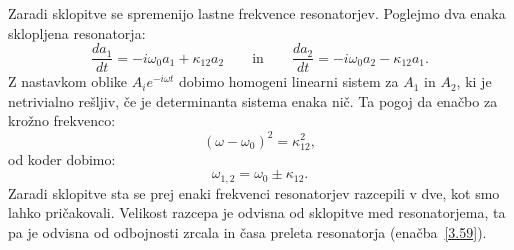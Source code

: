 Zaradi sklopitve se spremenijo lastne frekvence resonatorjev. 
Poglejmo dva enaka sklopljena resonatorja:
\begin{equation}
\frac{da_1}{dt}  =  -i\omega_{0}a_{1}+\kappa_{12}a_{2} \qquad \mathrm{in} \qquad 
\frac{da_2}{dt} =  -i\omega_{0}a_{2}-\kappa_{12}a_{1}.
\end{equation}
Z nastavkom oblike $A_{i}e^{-i\omega t}$ dobimo homogeni linearni sistem za $A_{1}$ in
$A_{2}$, ki je netrivialno rešljiv, če je determinanta sistema enaka nič.
Ta pogoj da enačbo za krožno frekvenco:
\begin{equation}
(\omega-\omega_{0})^{2}=\kappa_{12}^{2}\label{3.61},
\end{equation}
od koder dobimo:
\begin{equation}
\omega_{1,2}=\omega_{0}\pm\kappa_{12}.\label{3.62}
\end{equation}
Zaradi sklopitve sta se prej enaki frekvenci resonatorjev razcepili v dve, kot
smo lahko pričakovali. Velikost razcepa je odvisna od sklopitve med resonatorjema, ta
pa je odvisna od odbojnosti zrcala in časa
preleta resonatorja (enačba~\ref{3.59}).
